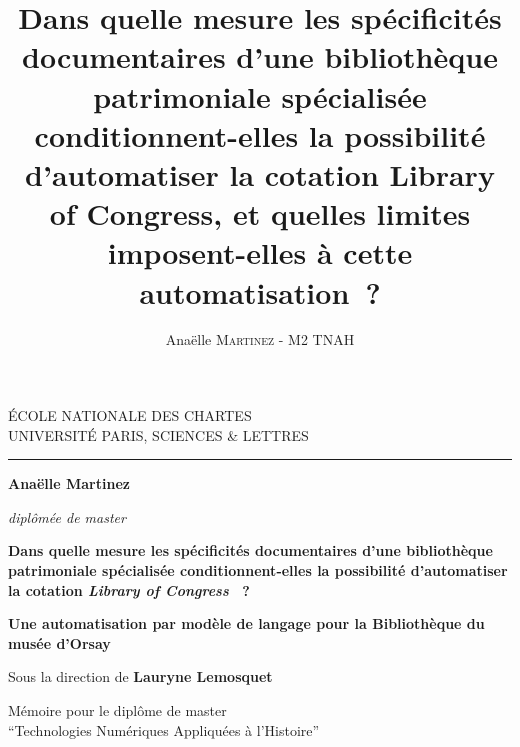 \documentclass[12pt,twoside]{book}
\author{Anaëlle \textsc{Martinez} - M2 TNAH}
\title{Dans quelle mesure les spécificités documentaires d'une bibliothèque patrimoniale spécialisée conditionnent-elles la possibilité d'automatiser la cotation Library of Congress, et quelles limites imposent-elles à cette automatisation~?}
\begin{document}
	\begin{titlepage}
		\begin{center}
			
			\bigskip
			
			\begin{large}				
				ÉCOLE NATIONALE DES CHARTES\\
				UNIVERSITÉ PARIS, SCIENCES \& LETTRES
			\end{large}
			\begin{center}\rule{2cm}{0.02cm}\end{center}
			
			\bigskip
			\bigskip
			\bigskip
			\begin{Large}
				\textbf{Anaëlle Martinez}\\
			\end{Large}
			\begin{normalsize} \textit{diplômée de master}
				
			\end{normalsize}
			
			\bigskip
			\bigskip
			\bigskip
			
			\begin{Huge}
				\textbf{Dans quelle mesure les spécificités documentaires d'une bibliothèque patrimoniale spécialisée conditionnent-elles la possibilité d'automatiser la cotation \textit{Library of Congress} ~?}\\
			\end{Huge}
			\bigskip
			\bigskip
			\begin{LARGE}
				\textbf{Une automatisation par modèle de langage pour la Bibliothèque du musée d'Orsay}\\
			\end{LARGE}
			
			\bigskip
			\bigskip
			\bigskip
			\begin{large}
				Sous la direction de \textbf{Lauryne Lemosquet}
			\end{large}
			\vfill
			
			\begin{large}
				Mémoire 
				pour le diplôme de master \\
				\enquote{Technologies Numériques Appliquées à l'Histoire} \\
			\end{large}
			
		\end{center}
	\end{titlepage}
\end{document}
